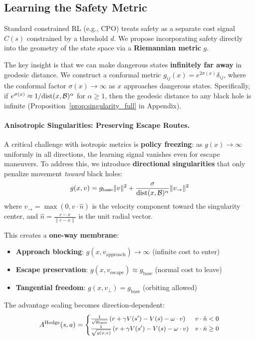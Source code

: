 \subsection{Learning the Safety Metric}

Standard constrained RL (e.g., CPO) treats safety as a separate cost signal $C(s)$ constrained by a threshold $d$. We propose incorporating safety directly into the geometry of the state space via a \textbf{Riemannian metric} $g$.

The key insight is that we can make dangerous states \textbf{infinitely far away} in geodesic distance. We construct a conformal metric $g_{ij}(x) = e^{2\sigma(x)} \delta_{ij}$, where the conformal factor $\sigma(x) \to \infty$ as $x$ approaches dangerous states. Specifically, if $e^{\sigma(x)} \approx 1/\text{dist}(x, \mathcal{B})^\alpha$ for $\alpha \ge 1$, then the geodesic distance to any black hole is infinite (Proposition~\ref{prop:singularity_full} in Appendix).

\paragraph{Anisotropic Singularities: Preserving Escape Routes.}
A critical challenge with isotropic metrics is \textbf{policy freezing}: as $g(x) \to \infty$ uniformly in all directions, the learning signal vanishes even for escape maneuvers. To address this, we introduce \textbf{directional singularities} that only penalize movement \emph{toward} black holes:
\begin{equation}
g(x, v) = g_{\text{base}} \|v\|^2 + \frac{\sigma}{\text{dist}(x, \mathcal{B})^\alpha} \|v_{\to}\|^2
\label{eq:anisotropic_metric}
\end{equation}
where $v_{\to} = \max(0, v \cdot \hat{n})$ is the velocity component toward the singularity center, and $\hat{n} = \frac{c-x}{\|c-x\|}$ is the unit radial vector.

This creates a \textbf{one-way membrane}:
\begin{itemize}
\item \textbf{Approach blocking}: $g(x, v_{\text{approach}}) \to \infty$ (infinite cost to enter)
\item \textbf{Escape preservation}: $g(x, v_{\text{escape}}) \approx g_{\text{base}}$ (normal cost to leave)
\item \textbf{Tangential freedom}: $g(x, v_{\perp}) = g_{\text{base}}$ (orbiting allowed)
\end{itemize}

The advantage scaling becomes direction-dependent:
\begin{equation}
\small
A^{\text{Hodge}}(s,a) = \begin{cases}
\frac{1}{\sqrt{g_{\text{base}}}} \left( r + \gamma V(s') - V(s) - \omega \cdot v \right) & v \cdot \hat{n} < 0 \\
\frac{1}{\sqrt{g(x,v)}} \left( r + \gamma V(s') - V(s) - \omega \cdot v \right) & v \cdot \hat{n} \geq 0
\end{cases}
\label{eq:directional_advantage}
\end{equation}

